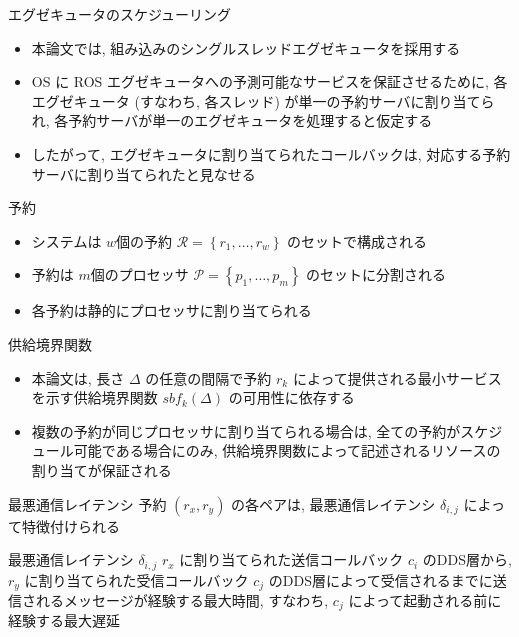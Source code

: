 \begin{frame}{エグゼキュータのスケジューリング}
    \begin{itemize}
        \item 本論文では, 組み込みのシングルスレッドエグゼキュータを採用する
        \item OS に ROS エグゼキュータへの予測可能なサービスを保証させるために, 各エグゼキュータ (すなわち, 各スレッド) が単一の予約サーバに割り当てられ, 各予約サーバが単一のエグゼキュータを処理すると仮定する
        \item したがって, エグゼキュータに割り当てられたコールバックは, 対応する予約サーバに割り当てられたと見なせる
    \end{itemize}
\end{frame}

\begin{frame}{予約}
    \begin{itemize}
        \item システムは $w$個の予約 $\mathcal{R}=\left\{r_{1}, \ldots, r_{w}\right\}$ のセットで構成される
        \item 予約は $m$個のプロセッサ $\mathcal{P}=\left\{p_{1}, \ldots, p_{m}\right\}$ のセットに分割される
        \item 各予約は静的にプロセッサに割り当てられる
    \end{itemize}
\end{frame}

\begin{frame}{供給境界関数}
    \begin{itemize}
        \item 本論文は, 長さ $\Delta$ の任意の間隔で予約 $r_{k}$ によって提供される最小サービスを示す供給境界関数 $s b f_{k}(\Delta)$ の可用性に依存する
        \item 複数の予約が同じプロセッサに割り当てられる場合は, 全ての予約がスケジュール可能である場合にのみ, 供給境界関数によって記述されるリソースの割り当てが保証される
    \end{itemize}
\end{frame}

\begin{frame}{最悪通信レイテンシ}
    予約 $\left(r_{x}, r_{y}\right)$ の各ペアは, 最悪通信レイテンシ $\delta_{i, j}$ によって特徴付けられる
    \begin{block}{最悪通信レイテンシ $\delta_{i, j}$}
        $r_x$ に割り当てられた送信コールバック $c_i$ のDDS層から, $r_y$ に割り当てられた受信コールバック $c_j$ のDDS層によって受信されるまでに送信されるメッセージが経験する最大時間, すなわち, $c_j$ によって起動される前に経験する最大遅延
    \end{block}
\end{frame}

